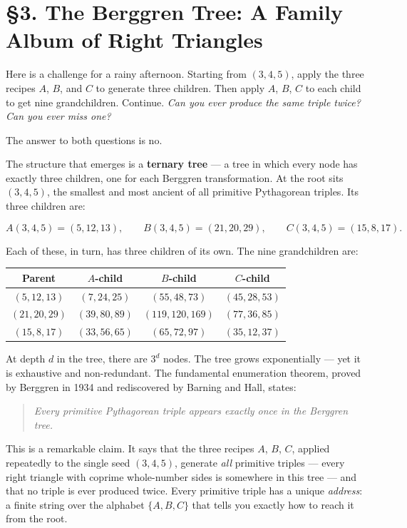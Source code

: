 \documentclass[12pt, letterpaper, openany]{book}
\theoremstyle{definition}
\theoremstyle{remark}
\begin{document}
\section*{§3. The Berggren Tree: A Family Album of Right Triangles}


Here is a challenge for a rainy afternoon. Starting from $(3, 4, 5)$, apply the three recipes $A$, $B$, and $C$ to generate three children. Then apply $A$, $B$, $C$ to each child to get nine grandchildren. Continue. \textit{Can you ever produce the same triple twice? Can you ever miss one?}

The answer to both questions is no.

The structure that emerges is a \textbf{ternary tree} --- a tree in which every node has exactly three children, one for each Berggren transformation. At the root sits $(3, 4, 5)$, the smallest and most ancient of all primitive Pythagorean triples. Its three children are:

\[
A(3,4,5) = (5, 12, 13), \qquad B(3,4,5) = (21, 20, 29), \qquad C(3,4,5) = (15, 8, 17).
\]

Each of these, in turn, has three children of its own. The nine grandchildren are:


\begin{center}
\begin{tabular}{|c|c|c|c|}
\hline
Parent & $A$-child & $B$-child & $C$-child \\
\hline
$(5, 12, 13)$ & $(7, 24, 25)$ & $(55, 48, 73)$ & $(45, 28, 53)$ \\
$(21, 20, 29)$ & $(39, 80, 89)$ & $(119, 120, 169)$ & $(77, 36, 85)$ \\
$(15, 8, 17)$ & $(33, 56, 65)$ & $(65, 72, 97)$ & $(35, 12, 37)$ \\
\hline
\end{tabular}
\end{center}


At depth $d$ in the tree, there are $3^d$ nodes. The tree grows exponentially --- yet it is exhaustive and non-redundant. The fundamental enumeration theorem, proved by Berggren in 1934 and rediscovered by Barning and Hall, states:


\begin{quote}
\textit{Every primitive Pythagorean triple appears exactly once in the Berggren tree.}
\end{quote}


This is a remarkable claim. It says that the three recipes $A$, $B$, $C$, applied repeatedly to the single seed $(3, 4, 5)$, generate \textit{all} primitive triples --- every right triangle with coprime whole-number sides is somewhere in this tree --- and that no triple is ever produced twice. Every primitive triple has a unique \textit{address}: a finite string over the alphabet $\{A, B, C\}$ that tells you exactly how to reach it from the root.
\end{document}
